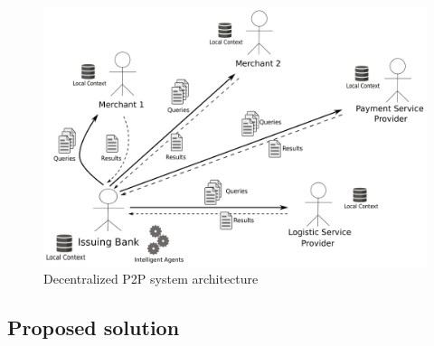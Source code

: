 \begin{figure}[H]
	\centering
		\includegraphics[width=0.8\columnwidth]{images/system_P2P_decentralized.pdf}
	\caption{Decentralized P2P system architecture}
\label{fig:images_p2p_decentralized}
\end{figure}


\subsection{Proposed solution}
\label{subsec:proposed_solution}



